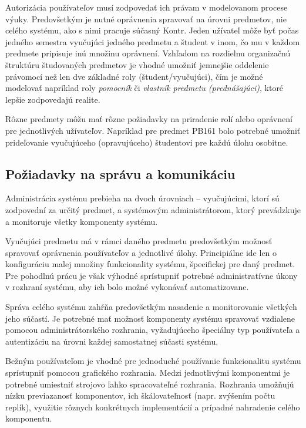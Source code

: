 \documentclass[
  digital, %
  oneside, %
  table,   %
  lof,     %
  lot,   %
]{fithesis3}
\begin{document}
Autorizácia používateľov musí zodpovedať ich právam v modelovanom procese výuky. Predovšetkým je nutné oprávnenia spravovať na úrovni predmetov, nie celého systému, ako s nimi pracuje súčasný Kontr. Jeden užívateľ môže byť počas jedného semestra vyučujúci jedného predmetu a študent v inom, čo mu v každom predmete pripisuje inú množinu oprávnení. Vzhľadom na rozdielnu organizačnú štruktúru študovaných predmetov je vhodné umožniť jemnejšie oddelenie právomocí než len dve základné roly (študent/vyučujúci), čím je možné modelovať napríklad roly \emph{pomocník} či \emph{vlastník predmetu (prednášajúci)}, ktoré lepšie zodpovedajú realite.

Rôzne predmety môžu mať rôzne požiadavky na priradenie rolí alebo oprávnení pre jednotlivých užívateľov. Napríklad pre predmet PB161 bolo potrebné umožniť prideľovanie vyučujúceho (opravujúceho) študentovi pre každú úlohu osobitne.

\subsection{Požiadavky na správu a komunikáciu}

Administrácia systému prebieha na dvoch úrovniach -- vyučujúcimi, ktorí sú zodpovední za určitý predmet, a systémovým administrátorom, ktorý prevádzkuje a monitoruje všetky komponenty systému. 

Vyučujúci predmetu má v rámci daného predmetu predovšetkým možnosť spravovať oprávnenia používateľov a jednotlivé úlohy. Principiálne ide len o konfiguráciu malej množiny funkcionality systému, špecifickej pre daný predmet. Pre pohodlnú prácu je však výhodné sprístupniť potrebné administratívne úkony v rozhraní systému, aby ich bolo možné vykonávať automatizovane.

Správa celého systému zahŕňa predovšetkým nasadenie a monitorovanie všetkých jeho súčastí. Je potrebné mať možnosť komponenty systému spravovať vzdialene pomocou administrátorského rozhrania, vyžadujúceho špeciálny typ používateľa a autentizáciu na úrovni každej samostatnej súčasti systému.

Bežným používateľom je vhodné pre jednoduché používanie funkcionalitu systému sprístupniť pomocou grafického rozhrania. Medzi jednotlivými komponentmi je potrebné umiestniť strojovo ľahko spracovateľné rozhrania. Rozhrania umožňujú nízku previazanosť komponentov, ich škálovateľnosť (napr. zvýšením počtu replík), využitie rôznych konkrétnych implementácií a prípadné nahradenie celého komponentu.
\end{document}
